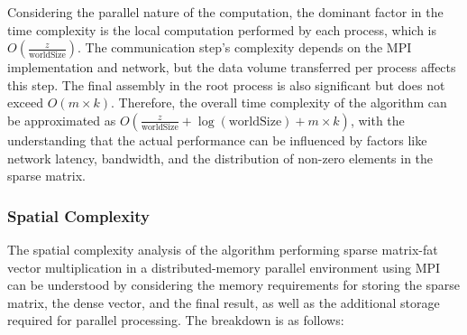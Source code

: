 \documentclass[12pt,oneside]{book} %
\begin{document}
Considering the parallel nature of the computation, the dominant factor in the
time complexity is the local computation performed by each process, which is \(
O\left(\frac{z}{\text{worldSize}}\right) \). The communication step's
complexity depends on the MPI implementation and network, but the data volume
transferred per process affects this step. The final assembly in the root
process is also significant but does not exceed \( O(m \times k) \). Therefore,
the overall time complexity of the algorithm can be approximated as \(
O\left(\frac{z}{\text{worldSize}} + \log(\text{worldSize}) + m \times k\right)
\), with the understanding that the actual performance can be influenced by
factors like network latency, bandwidth, and the distribution of non-zero
elements in the sparse matrix.

\subsubsection{Spatial Complexity}
The spatial complexity analysis of the algorithm performing sparse matrix-fat
vector multiplication in a distributed-memory parallel environment using MPI
can be understood by considering the memory requirements for storing the sparse
matrix, the dense vector, and the final result, as well as the additional
storage required for parallel processing. The breakdown is as follows:
\end{document}
